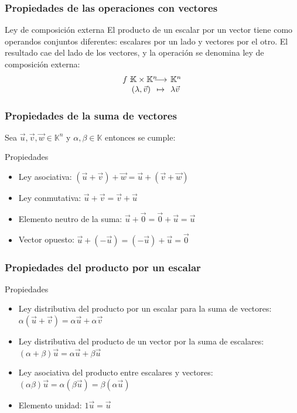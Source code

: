 \documentclass{beamer}
\begin{document}
\begin{frame}
  \frametitle{Propiedades de las operaciones con vectores}
    \begin{block}{Ley de composici\'on externa}
El producto de un escalar por un vector tiene como operandos conjuntos diferentes: escalares por un lado y vectores por el otro. El resultado cae del lado de los vectores, y la operaci\'on se denomina ley de composici\'on externa:
\[\begin{array}{r@{\hspace{-2pt}}c@{\hspace{-4pt}}
c@{\hspace{4pt}}l}
f:&\mathbb K\times \mathbb K^n&\longrightarrow&\mathbb K^n\\
  &(\lambda, \vec{v})\ \ &\mapsto&\lambda  \vec v
\end{array}\]
\end{block}
\end{frame}



\begin{frame}
  \frametitle{Propiedades de la suma de vectores}
Sea $\vec u, \vec v, \vec w\in \mathbb K^n$ y $\alpha, \beta\in\mathbb K$ entonces se cumple:
    \begin{block}{Propiedades}
\begin{itemize}
\item Ley asociativa: $(\vec u+\vec v) +\vec w = \vec u +(\vec v + \vec w)$
\item Ley conmutativa: $\vec u+\vec v = \vec v +\vec u$
\item Elemento neutro de la suma: $\vec u+\vec 0 = \vec 0 +\vec u = \vec u$
\item Vector opuesto: $\vec u+(-\vec{u}) = (-\vec u) +\vec u = \vec 0$
\end{itemize}
\end{block}
\end{frame}

\begin{frame}
  \frametitle{Propiedades del producto por un escalar}
    \begin{block}{Propiedades}
\begin{itemize}
\item Ley distributiva del producto por un escalar para la suma de vectores: $\alpha(\vec u+\vec v)  = \alpha\vec u +\alpha\vec v $
\item Ley distributiva del producto de un vector por la suma de escalares: $(\alpha+\beta)\vec u =\alpha \vec u +\beta\vec u$
\item Ley asociativa del producto entre escalares y vectores: $(\alpha\beta)\vec u = \alpha (\beta\vec u) = \beta(\alpha\vec u )$
\item Elemento unidad: $1\vec u = \vec u$
\end{itemize}
\end{block}
\end{frame}
\end{document}
